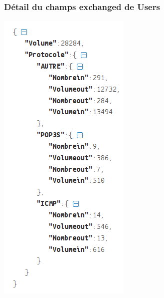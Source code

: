 \documentclass{beamer}
\begin{document}
  \begin{frame}
  \frametitle{Détail du champs exchanged de Users}
    \begin{center}
       \includegraphics[scale=0.4]{json.png}
    \end{center}
  \end{frame}
\end{document}
